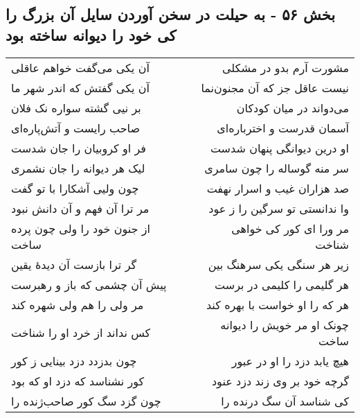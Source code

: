 \begin{center}
\section*{بخش ۵۶ - به حیلت در سخن آوردن سایل آن بزرگ را کی خود را دیوانه ساخته بود}
\label{sec:sh056}
\begin{longtable}{l p{0.5cm} r}
آن یکی می‌گفت خواهم عاقلی
&&
مشورت آرم بدو در مشکلی
\\
آن یکی گفتش که اندر شهر ما
&&
نیست عاقل جز که آن مجنون‌نما
\\
بر نیی گشته سواره نک فلان
&&
می‌دواند در میان کودکان
\\
صاحب رایست و آتش‌پاره‌ای
&&
آسمان قدرست و اخترباره‌ای
\\
فر او کروبیان را جان شدست
&&
او درین دیوانگی پنهان شدست
\\
لیک هر دیوانه را جان نشمری
&&
سر منه گوساله را چون سامری
\\
چون ولیی آشکارا با تو گفت
&&
صد هزاران غیب و اسرار نهفت
\\
مر ترا آن فهم و آن دانش نبود
&&
وا ندانستی تو سرگین را ز عود
\\
از جنون خود را ولی چون پرده ساخت
&&
مر ورا ای کور کی خواهی شناخت
\\
گر ترا بازست آن دیدهٔ یقین
&&
زیر هر سنگی یکی سرهنگ بین
\\
پیش آن چشمی که باز و رهبرست
&&
هر گلیمی را کلیمی در برست
\\
مر ولی را هم ولی شهره کند
&&
هر که را او خواست با بهره کند
\\
کس نداند از خرد او را شناخت
&&
چونک او مر خویش را دیوانه ساخت
\\
چون بدزدد دزد بینایی ز کور
&&
هیچ یابد دزد را او در عبور
\\
کور نشناسد که دزد او که بود
&&
گرچه خود بر وی زند دزد عنود
\\
چون گزد سگ کور صاحب‌ژنده را
&&
کی شناسد آن سگ درنده را
\\
\end{longtable}
\end{center}
